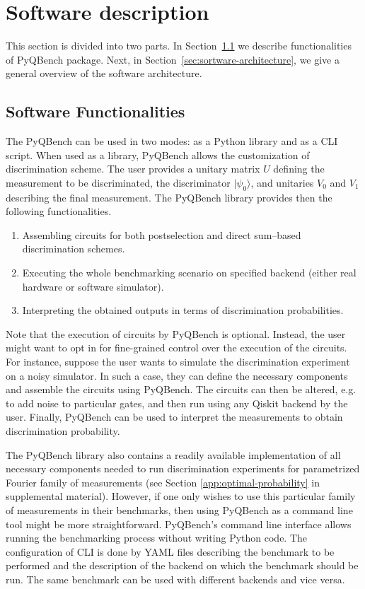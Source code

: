 \documentclass[preprint,12pt, a4paper, dvipsnames]{elsarticle}
\newcommand{\ket}[1]{\ensuremath{|#1\rangle}}
\newcommand{\1}{{\rm 1\hspace{-0.9mm}l}}
\theoremstyle{definition}
\begin{document}
 \section{Software description}
 \label{}
 This section is divided into two parts.
 In Section~\ref{sec:sortware-functionalities} we describe functionalities of PyQBench
 package. Next, in Section~\ref{sec:sortware-architecture}, we give a general overview of the
 software architecture.

\subsection{Software Functionalities}\label{sec:sortware-functionalities}

The PyQBench can be used in two modes: as a Python library and as a CLI script. When used as a
library, PyQBench allows the customization of discrimination scheme. The user provides
a unitary matrix $U$ defining the measurement to be discriminated, the discriminator $\ket{\psi_0}$,
and unitaries $V_0$ and $V_1$ describing the final measurement. The PyQBench library provides then
the following functionalities.

\begin{enumerate}
	\item Assembling circuits for both postselection and direct sum--based discrimination schemes.
	\item Executing the whole benchmarking scenario on specified backend (either real hardware or
	software simulator).
	\item Interpreting the obtained outputs in terms of discrimination probabilities.
\end{enumerate}
Note that the execution of circuits by PyQBench is optional. Instead, the user might want to opt in
for fine-grained control over the execution of the circuits. For instance, suppose the user wants to
simulate the discrimination experiment on a noisy simulator. In such a case, they can define the
necessary components and assemble the circuits using PyQBench. The circuits can then be altered,
e.g. to add noise to particular gates, and then run using any Qiskit backend by the user. Finally,
PyQBench can be used to interpret the measurements to obtain discrimination probability.

The PyQBench library also contains a readily available implementation of all necessary components
needed to run discrimination experiments for parametrized Fourier family of measurements (see
Section \ref{app:optimal-probability} in supplemental material). However, if one only wishes to use
this particular family of measurements in their benchmarks, then using PyQBench as a command line tool
might be more straightforward. PyQBench's command line interface allows running the benchmarking process
without writing Python code. The configuration of CLI is done by YAML \cite{yaml} files describing the
benchmark to be performed and the description of the backend on which the benchmark should be run.
The same benchmark can be used with different backends and vice versa.
\end{document}
